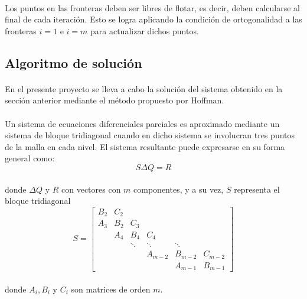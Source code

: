 \documentclass[letterpaper, openright, 12pt]{book}
\begin{document}
	\paragraph*{}
		Los puntos en las fronteras deben ser libres de flotar, es decir, deben calcularse al final de cada iteración. Esto se logra aplicando la condición de ortogonalidad a las fronteras $i = 1$ e $i = m$ para actualizar dichos puntos.
	
	\subsection{Algoritmo de solución}
	\paragraph*{}
		En el presente proyecto se lleva a cabo la solución del sistema obtenido en la sección anterior mediante el método propuesto por Hoffman\cite{hoffmann2000computational}.
	
	\paragraph*{}
		Un sistema de ecuaciones diferenciales parciales es aproximado mediante un sistema de bloque tridiagonal cuando en dicho sistema se involucran tres puntos de la malla en cada nivel. El sistema resultante puede expresarse en su forma general como:
		\begin{equation}
			S \Delta Q = R
			\label{hyper-sol-1}
		\end{equation}\\
		donde $\Delta Q$ y $R$ con vectores con $m$ componentes, y a su vez, $S$ representa el bloque tridiagonal
		\begin{equation*}
			S = \begin{bmatrix}
			B_2 & C_2\\
			A_3 & B_2 & C_3\\
			& A_4 & B_4 & C_4\\
			& & \ddots & \ddots & \ddots\\
			& & & A_{m-2} & B_{m-2} & C_{m-2}\\
			& & & & A_{m-1} & B_{m-1}
			\end{bmatrix}
		\end{equation*}\\
		donde $A_i, B_i$ y $C_i$ son matrices de orden $m$.
		
\end{document}
